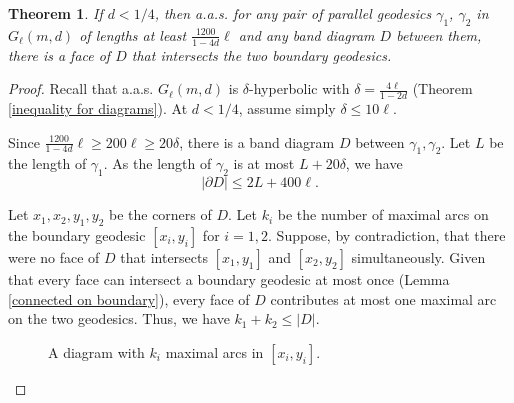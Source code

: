 \documentclass[a4paper]{article}
\newtheorem{thm}{Theorem}[section]
\theoremstyle{remark}
\begin{document}
\quad

\begin{thm}\label{parallel diagram in one forth}
    If $d<1/4$, then a.a.s. for any pair of parallel geodesics $\gamma_1$, $\gamma_2$ in $G_\ell(m,d)$ of lengths at least $\frac{1200}{1-4d}\ell$ and any band diagram $D$ between them, there is a face of $D$ that intersects the two boundary geodesics.
\end{thm}

\begin{proof}
    Recall that a.a.s. $G_\ell(m,d)$ is $\delta$-hyperbolic with $\delta = \frac{4\ell}{1-2d}$ (Theorem \ref{inequality for diagrams}). At $d<1/4$, assume simply $\delta\leq 10\ell$.

    Since $\frac{1200}{1-4d}\ell\geq 200\ell\geq 20\delta$, there is a band diagram $D$ between $\gamma_1,\gamma_2$. Let $L$ be the length of $\gamma_1$. As the length of $\gamma_2$ is at most $L+20\delta$, we have \[|\partial D|\leq 2L+400\ell.\]
   
    Let $x_1,x_2,y_1,y_2$ be the corners of $D$. Let $k_i$ be the number of maximal arcs on the boundary geodesic $[x_i,y_i]$ for $i=1,2$. Suppose, by contradiction, that there were no face of $D$ that intersects $[x_1,y_1]$ and $[x_2,y_2]$ simultaneously. Given that every face can intersect a boundary geodesic at most once (Lemma \ref{connected on boundary}), every face of $D$ contributes at most one maximal arc on the two geodesics. Thus, we have $k_1+k_2\leq |D|$.
     
\begin{figure}[h]
\begin{center}
\end{center}
    \caption{A diagram with $k_i$ maximal arcs in $[x_i,y_i]$.}
\end{figure}
    

\end{proof}
\end{document}
